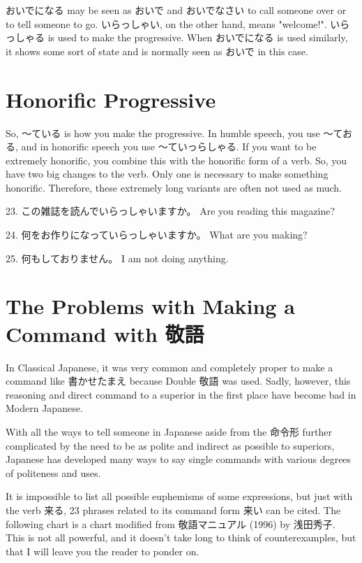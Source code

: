 \par{ おいでになる may be seen as おいで and おいでなさい to call someone over or to tell someone to go. いらっしゃい, on the other hand, means "welcome!". いらっしゃる is used to make the progressive. When おいでになる is used similarly, it shows some sort of state and is normally seen as おいで in this case. }
      
\section{Honorific Progressive}
 
\par{ So, ～ている is how you make the progressive. In humble speech, you use ～ておる, and in honorific speech you use ～ていっらしゃる. If you want to be extremely honorific, you combine this with the honorific form of a verb. So, you have two big changes to the verb. Only one is necessary to make something honorific. Therefore, these extremely long variants are often not used as much. }
 
\par{23. この雑誌を読んでいらっしゃいますか。 \hfill\break
Are you reading this magazine? }
 
\par{24. 何をお作りになっていらっしゃいますか。 \hfill\break
What are you making? }
 
\par{25. 何もしておりません。 \hfill\break
I am not doing anything. }
      
\section{The Problems with Making a Command with 敬語}
 
\par{ In Classical Japanese, it was very common and completely proper to make a command like 書かせたまえ because Double 敬語 was used. Sadly, however, this reasoning and direct command to a superior in the first place have become bad in Modern Japanese. }

\par{ With all the ways to tell someone in Japanese aside from the 命令形 further complicated by the need to be as polite and indirect as possible to superiors, Japanese has developed many ways to say single commands with various degrees of politeness and uses. }

\par{ It is impossible to list all possible euphemisms of some expressions, but just with the verb 来る, 23 phrases related to its command form 来い can be cited. The following chart is a chart modified from 敬語マニュアル (1996) by 浅田秀子. This is not all powerful, and it doesn't take long to think of counterexamples, but that I will leave you the reader to ponder on. }

